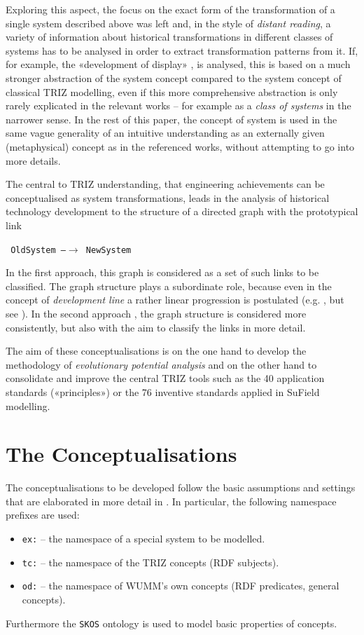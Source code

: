 \documentclass[11pt,a4paper]{article}
\begin{document}
Exploring this aspect, the focus on the exact form of the transformation of a
single system described above was left and, in the style of \emph{distant
  reading}, a variety of information about historical transformations in
different classes of systems has to be analysed in order to extract
transformation patterns from it.  If, for example, the «development of
display» \cite[p. 22]{TESE2018}, \cite[ch. 5]{Shpakovsky2016} is analysed,
this is based on a much stronger abstraction of the system concept compared to
the system concept of classical TRIZ modelling, even if this more
comprehensive abstraction is only rarely explicated in the relevant works --
for example as a \emph{class of systems} in the narrower sense. In the rest of
this paper, the concept of system is used in the same vague generality of an
intuitive understanding as an externally given (metaphysical) concept as in
the referenced works, without attempting to go into more details.

The central to TRIZ understanding, that engineering achievements can be
conceptualised as system transformations, leads in the analysis of historical
technology development to the structure of a directed graph with the
prototypical link
\begin{center}\tt
  OldSystem \textrm{---}$\to$ NewSystem
\end{center}
In the first approach, this graph is considered as a set of such links to be
classified. The graph structure plays a subordinate role, because even in the
concept of \emph{development line} a rather linear progression is postulated
(e.g. \cite[Figure 4.104]{KS}, but see \cite[4.8.4 and Figure 4.72]{KS}). In
the second approach \cite{Shpakovsky2016}, the graph structure is considered
more consistently, but also with the aim to classify the links in more detail.

The aim of these conceptualisations is on the one hand to develop the
methodology of \emph{evolutionary potential analysis} \cite[4.8.7]{KS} and on
the other hand to consolidate and improve the central TRIZ tools such as the
40 application standards («principles») or the 76 inventive standards applied
in SuField modelling.

\section{The Conceptualisations}

The conceptualisations to be developed follow the basic assumptions and
settings that are elaborated in more detail in \cite{Graebe2021}. In
particular, the following namespace prefixes are used:
\begin{itemize}[noitemsep]
\item \texttt{ex:} -- the namespace of a special system to be modelled. 
\item \texttt{tc:} -- the namespace of the TRIZ concepts (RDF subjects).
\item \texttt{od:} -- the namespace of WUMM's own concepts (RDF predicates,
  general concepts). 
\end{itemize}
Furthermore the \texttt{SKOS} ontology is used to model basic properties of
concepts.
\end{document}
